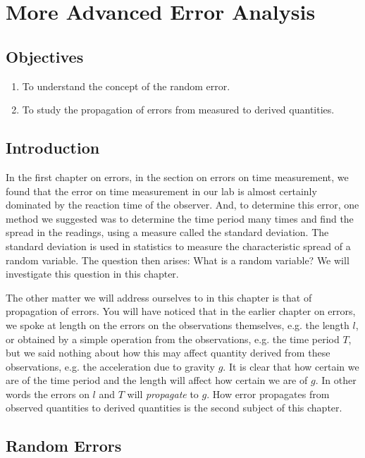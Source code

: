\chapter{More Advanced Error Analysis}

\section{Objectives}

\begin{enumerate}
    \item To understand the concept of the random error.
    \item To study the propagation of errors from measured to derived quantities.
\end{enumerate}

\section{Introduction}

In the first chapter on errors, in the section on errors on time measurement, we found that the error on time measurement in our lab is almost certainly dominated by the reaction time of the observer. And, to determine this error, one method we suggested was to determine the time period many times and find the spread in the readings, using a measure called the standard deviation. The standard deviation is used in statistics to measure the characteristic spread of a random variable. The question then arises: What is a random variable? We will investigate this question in this chapter. 

The other matter we will address ourselves to in this chapter is that of propagation of errors. You will have noticed that in the earlier chapter on errors, we spoke at length on the errors on the observations themselves, e.g. the length $l$, or obtained by a simple operation from the observations, e.g. the time period $T$, but we said nothing about how this may affect quantity derived from these observations, e.g. the acceleration due to gravity $g$. It is clear that how certain we are of the time period and the length will affect how certain we are of $g$. In other words the errors on $l$ and $T$ will \textit{propagate} to $g$. How error propagates from observed quantities to derived quantities is the second subject of this chapter. 

\section{Random Errors}


